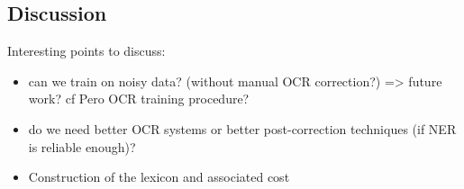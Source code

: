 \subsection{Discussion}
Interesting points to discuss:
\begin{itemize}
    \item can we train on noisy data? (without manual OCR correction?) => future work? cf Pero OCR training procedure?
    \item do we need better OCR systems or better post-correction techniques (if NER is reliable enough)?
    \item Construction of the lexicon and associated cost
\end{itemize}
